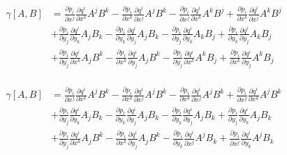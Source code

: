 \documentclass[a4paper,10pt]{article}
\numberwithin{equation}{section}
\begin{document}
\begin{align}
\begin{split}
 \gamma[A,B] &= \frac{\partial p_i}{\partial x^j}\frac{\partial q^i}{\partial x^k}A^jB^k 
 - \frac{\partial p_i}{\partial x^k}\frac{\partial q^i}{\partial x^j}A^jB^k
 - \frac{\partial p_i}{\partial x^j}\frac{\partial q^i}{\partial x^k}A^kB^j 
 + \frac{\partial p_i}{\partial x^k}\frac{\partial q^i}{\partial x^j}A^kB^j\\
 &+ \frac{\partial p_i}{\partial y_j}\frac{\partial q^i}{\partial y_k}A_jB_k 
 - \frac{\partial p_i}{\partial y_k}\frac{\partial q^i}{\partial y_j}A_jB_k
 - \frac{\partial p_i}{\partial y_j}\frac{\partial q^i}{\partial y_k}A_kB_j 
 + \frac{\partial p_i}{\partial y_k}\frac{\partial q^i}{\partial y_j}A_kB_j\\
 &+  \frac{\partial p_i}{\partial y_j}\frac{\partial q^i}{\partial x^k}A_jB^k
 - \frac{\partial p_i}{\partial x^k}\frac{\partial q^i}{\partial y_j}A_jB^k
 -\frac{\partial p_i}{\partial y_j}\frac{\partial q^i}{\partial x^k}A^kB_j 
 + \frac{\partial p_i}{\partial x^k}\frac{\partial q^i}{\partial y_j}A^kB_j
\end{split}
\end{align}

\begin{align}
\begin{split}
 \gamma[A,B] &= \frac{\partial p_i}{\partial x^j}\frac{\partial q^i}{\partial x^k}A^jB^k 
 - \frac{\partial p_i}{\partial x^k}\frac{\partial q^i}{\partial x^j}A^jB^k
 - \frac{\partial p_i}{\partial x^k}\frac{\partial q^i}{\partial x^j}A^jB^k 
 + \frac{\partial p_i}{\partial x^j}\frac{\partial q^i}{\partial x^k}A^jB^k\\
 &+ \frac{\partial p_i}{\partial y_j}\frac{\partial q^i}{\partial y_k}A_jB_k 
 - \frac{\partial p_i}{\partial y_k}\frac{\partial q^i}{\partial y_j}A_jB_k
 - \frac{\partial p_i}{\partial y_k}\frac{\partial q^i}{\partial y_j}A_jB_k 
 + \frac{\partial p_i}{\partial y_j}\frac{\partial q^i}{\partial y_k}A_jB_k\\
 &+  \frac{\partial p_i}{\partial y_j}\frac{\partial q^i}{\partial x^k}A_jB^k
 - \frac{\partial p_i}{\partial x^k}\frac{\partial q^i}{\partial y_j}A_jB^k
 -\frac{\partial p_i}{\partial y_k}\frac{\partial q^i}{\partial x^j}A^jB_k 
 + \frac{\partial p_i}{\partial x^j}\frac{\partial q^i}{\partial y_k}A^jB_k
\end{split}
\end{align}
\end{document}
